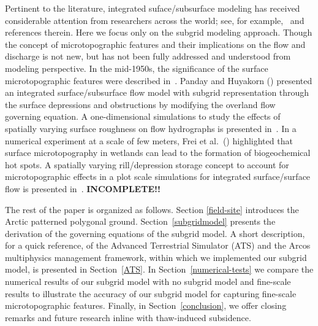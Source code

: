 \documentclass[review,11pt]{elsarticle}
\begin{document}
Pertinent to the literature, integrated suface/subsurface modeling has received considerable attention from researchers across the world; see, for example,~\cite{painter2013modeling,kurylyk2014climate,spainter2016integrated} and references therein. Here we focus only on the subgrid modeling approach. Though the concept of microtopographic features and their implications on the flow and discharge is not new, but has not been fully addressed and understood from modeling perspective. 
In the mid-1950s, the significance of the surface microtopographic features were described in~\cite{stammers1956effect}. Panday and Huyakorn (\citeyear{panday2004fully}) presented an integrated surface/subsurface flow model with subgrid representation through the surface depressions and obstructions by modifying the overland flow governing equation. A one-dimensional simulations to study the effects of spatially varying surface roughness on flow hydrographs is presented in~\cite{huang2009influences}. In a numerical experiment at a scale of few meters, Frei et al.~(\citeyear{frei2012surface}) highlighted that surface microtopography in wetlands can lead to the formation of biogeochemical hot spots. A spatially varying rill/depression storage concept to account for microtopographic effects in a plot scale simulations for integrated surface/surface flow is presented in~\cite{frei2014representing}.
 \textbf{INCOMPLETE!!}

The rest of the paper is organized as follows. Section \ref{field-site} introduces the Arctic patterned polygonal ground. Section~\ref{subgridmodel} presents the derivation of the governing equations of the subgrid model. A short description, for a quick reference, of the Advanced Terrestrial Simulator (ATS) and the Arcos multiphysics management framework, within which we implemented our subgrid model, is presented in Section~\ref{ATS}. In Section~\ref{numerical-tests} we compare the numerical results of our subgrid model with no subgrid model and fine-scale results to illustrate the accuracy of our subgrid model for capturing fine-scale microtopographic features. Finally, in Section~\ref{conclusion}, we offer closing remarks and future research inline with thaw-induced subsidence.
\end{document}
